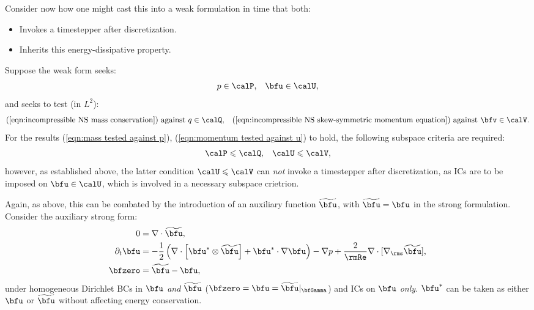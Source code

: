     Consider now how one might cast this into a weak formulation in time that both:
    \begin{itemize}
        \item  Invokes a timestepper after discretization.
        \item  Inherits this energy-dissipative property.
    \end{itemize}
    Suppose the weak form seeks:
    \begin{align}
           p  \in  \calP,  &&
        \bfu  \in  \calU,
    \end{align}
    and seeks to test (in $L^{2}$):
    \begin{align}
                           \text{(\ref{eqn:incompressible NS mass conservation}) against }    q \in \calQ,  &&
        \text{(\ref{eqn:incompressible NS skew-symmetric momentum equation}) against } \bfv \in \calV.
    \end{align}
    For the results (\ref{eqn:mass tested against p}), (\ref{eqn:momentum tested against u}) to hold, the following subspace criteria are required:
    \begin{align}
        \calP  \leqslant  \calQ,  &&
        \calU  \leqslant  \calV,
    \end{align}
    however, as established above, the latter condition $\calU  \leqslant  \calV$ can \emph{not} invoke a timestepper after discretization, as ICs are to be imposed on $\bfu  \in  \calU$, which is involved in a necessary subspace crietrion. \contra
    
    Again, as above, this can be combated by the introduction of an auxiliary function $\widetilde{\bfu}$, with $\widetilde{\bfu}  =  \bfu$ in the strong formulation. Consider the auxiliary strong form:
    \begin{align}
                       0  &=  \nabla\cdot\widetilde{\bfu},  \\
        \partial_{t}\bfu  &=  - \frac{1}{2}\left(\nabla\cdot\left[\bfu^{*}\otimes\widetilde{\bfu}\right] + \bfu^{*}\cdot\nabla\bfu\right) - \nabla p + \frac{2}{\rmRe}\nabla\cdot[\nabla_{\rms}\widetilde{\bfu}],  \\
                 \bfzero  &=  \widetilde{\bfu} - \bfu,
    \end{align}
    under homogeneous Dirichlet BCs in $\bfu$ \emph{and} $\widetilde{\bfu}$ ($\bfzero  =  \bfu  =  \widetilde{\bfu}|_{\bfGamma}$) and ICs on $\bfu$ \emph{only}. $\bfu^{*}$ can be taken as either $\bfu$ or $\widetilde{\bfu}$ without affecting energy conservation.
    
